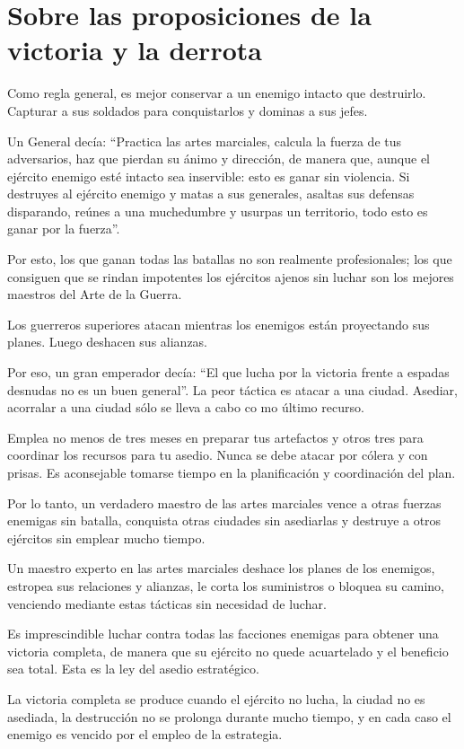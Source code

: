 \chapter{Sobre las proposiciones de la victoria y la derrota}

Como regla general, es mejor conservar a un enemigo intacto que destruirlo. Capturar a sus soldados para conquistarlos y dominas a sus jefes.

Un General decía: ``Practica las artes marciales, calcula la fuerza de tus adversarios, haz que pierdan su ánimo y dirección, de manera que, aunque el ejército enemigo esté intacto sea inservible: esto es ganar sin violencia. Si destruyes al ejército enemigo y matas a sus generales, asaltas sus defensas disparando, reúnes a una muchedumbre y usurpas un territorio, todo esto es ganar por la fuerza''.

Por esto, los que ganan todas las batallas no son realmente profesionales; los que consiguen que se rindan impotentes los ejércitos ajenos sin luchar son los mejores maestros del Arte de la Guerra.

Los guerreros superiores atacan mientras los enemigos están proyectando sus planes. Luego deshacen sus alianzas.

Por eso, un gran emperador decía: ``El que lucha por la victoria frente a espadas desnudas no es un buen general''. La peor táctica es atacar a una ciudad. Asediar, acorralar a una ciudad sólo se lleva a cabo co mo último recurso.

Emplea no menos de tres meses en preparar tus artefactos y otros tres para coordinar los recursos para tu asedio. Nunca se debe atacar por cólera y con prisas. Es aconsejable tomarse tiempo en la planificación y coordinación del plan.

Por lo tanto, un verdadero maestro de las artes marciales vence a otras fuerzas enemigas sin batalla, conquista otras ciudades sin asediarlas y destruye a otros ejércitos sin emplear mucho tiempo.

Un maestro experto en las artes marciales deshace los planes de los enemigos, estropea sus relaciones y alianzas, le corta los suministros o bloquea su camino, venciendo mediante estas tácticas sin necesidad de luchar.

Es imprescindible luchar contra todas las facciones enemigas para obtener una victoria completa, de manera que su ejército no quede acuartelado y el beneficio sea total. Esta es la ley del asedio estratégico.

La victoria completa se produce cuando el ejército no lucha, la ciudad no es asediada, la destrucción no se prolonga durante mucho tiempo, y en cada caso el enemigo es vencido por el empleo de la estrategia.

